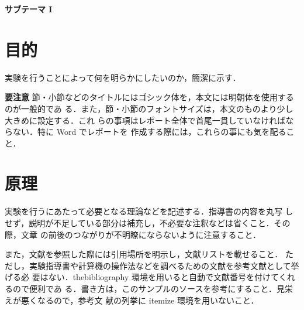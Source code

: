 \documentclass[a4j]{jsarticle}  %
\begin{document}
 

\thispagestyle{empty}
\setcounter{page}{0}




\newpage


\begin{center}
 {\Large \bf サブテーマ I}
\end{center}


\section{目的}
実験を行うことによって何を明らかにしたいのか，簡潔に示す．

\begin{itembox}[l]{\textbf{要注意}}
 節・小節などのタイトルにはゴシック体を，本文には明朝体を使用するのが一般的であ
 る．また，節・小節のフォントサイズは，本文のものより少し大きめに設定する．これ
 らの事項はレポート全体で首尾一貫していなければならない．特に Word でレポートを
 作成する際には，これらの事にも気を配ること．
\end{itembox}

\section{原理}
実験を行うにあたって必要となる理論など\cite{book1}を記述する．指導書の内容を丸写
しせず，説明が不足している部分は補充し，不必要な注釈などは省くこと．その際，文章
の前後のつながりが不明瞭にならないように注意すること．

また，文献を参照した際には引用場所を明示し，文献リストを載せること\cite{book2}．
ただし，実験指導書や計算機の操作法などを調べるための文献を参考文献として挙げる必
要はない．thebibliography 環境を用いると自動で文献番号を付けてくれるので便利であ
る．書き方は，このサンプルのソースを参考にすること．見栄えが悪くなるので，参考文
献の列挙に itemize 環境を用いないこと．
\end{document}
